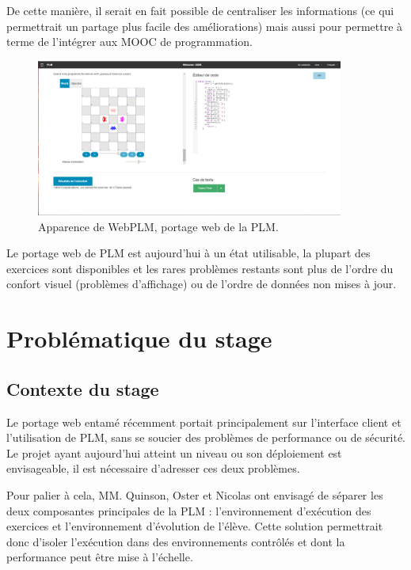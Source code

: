 \documentclass[stage]{tnreport}
\begin{document}
De cette manière, il serait en fait possible de centraliser les informations (ce qui permettrait un partage plus facile des améliorations) mais aussi pour permettre à terme de l'intégrer aux MOOC de programmation.
\begin{figure}[h]
	\centering
		\includegraphics[width=0.9\textwidth]{figures/WebPLM-exercice1}
	\caption{Apparence de WebPLM, portage web de la PLM.}
	\label{fig:wplmEx1}
\end{figure}

Le portage web de PLM est aujourd'hui à un état utilisable, la plupart des exercices sont disponibles et les rares problèmes restants sont plus de l'ordre du confort visuel (problèmes d'affichage) ou de l'ordre de données non mises à jour.

\cleardoublepage

\chapter{Problématique du stage}

\section{Contexte du stage}

Le portage web entamé récemment portait principalement sur l'interface client et l'utilisation de PLM, sans se soucier des problèmes de performance ou de sécurité.
Le projet ayant aujourd'hui atteint un niveau ou son déploiement est envisageable, il est nécessaire d'adresser ces deux problèmes.

Pour palier à cela, MM. Quinson, Oster et Nicolas ont envisagé de séparer les deux composantes principales de la PLM : l'environnement d'exécution des exercices et l'environnement d'évolution de l'élève.
Cette solution permettrait donc d'isoler l'exécution dans des environnements contrôlés et dont la performance peut être mise à l'échelle.
\end{document}
